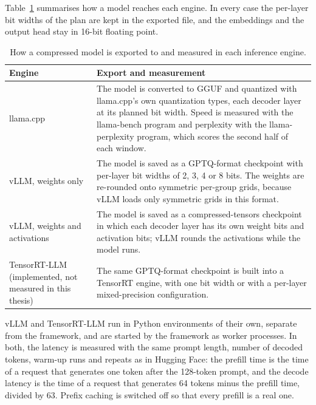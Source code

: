 Table~\ref{tab:ch4-engines} summarises how a model reaches each engine. In every case the per-layer bit widths of the plan are kept in the exported file, and the embeddings and the output head stay in 16-bit floating point.

\begin{table}[htbp]
\centering
\small
\caption{How a compressed model is exported to and measured in each inference engine.}
\label{tab:ch4-engines}
\renewcommand{\arraystretch}{1.2}
\begin{tabularx}{\textwidth}{lX}
\hline
\textbf{Engine} & \textbf{Export and measurement} \\
\hline
llama.cpp & The model is converted to GGUF \cite{ggml2025gguf} and quantized with llama.cpp's own quantization types, each decoder layer at its planned bit width. Speed is measured with the llama-bench program and perplexity with the llama-perplexity program, which scores the second half of each window. \\
vLLM, weights only & The model is saved as a GPTQ-format checkpoint with per-layer bit widths of 2, 3, 4 or 8 bits. The weights are re-rounded onto symmetric per-group grids, because vLLM loads only symmetric grids in this format. \\
vLLM, weights and activations & The model is saved as a compressed-tensors checkpoint in which each decoder layer has its own weight bits and activation bits; vLLM rounds the activations while the model runs. \\
TensorRT-LLM (implemented, not measured in this thesis) & The same GPTQ-format checkpoint is built into a TensorRT engine, with one bit width or with a per-layer mixed-precision configuration. \\
\hline
\end{tabularx}
\end{table}

vLLM and TensorRT-LLM run in Python environments of their own, separate from the framework, and are started by the framework as worker processes. In both, the latency is measured with the same prompt length, number of decoded tokens, warm-up runs and repeats as in Hugging Face: the prefill time is the time of a request that generates one token after the 128-token prompt, and the decode latency is the time of a request that generates 64 tokens minus the prefill time, divided by 63. Prefix caching is switched off so that every prefill is a real one.

